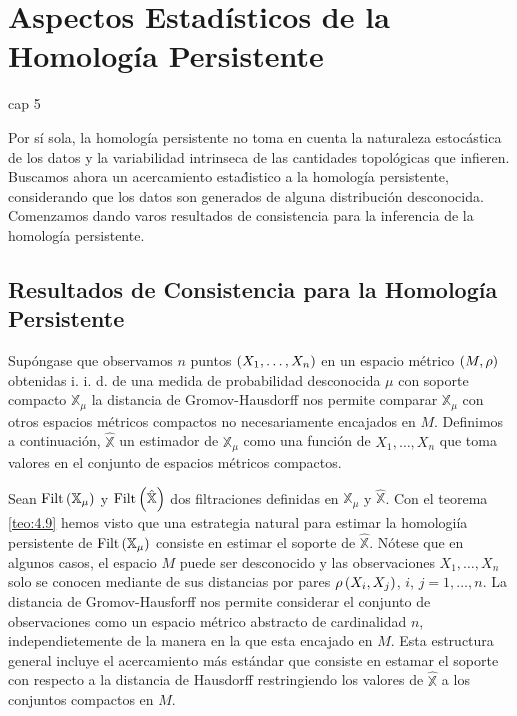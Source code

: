 \chapter{Aspectos Estad\'isticos de la Homolog\'ia Persistente}\label{chap:Cap5}cap 5

Por s\'i sola, la homolog\'ia persistente no toma en cuenta la naturaleza estoc\'astica de los datos
y la variabilidad intrinseca de las cantidades topol\'ogicas que infieren.
Buscamos ahora un acercamiento esta\'distico a la homolog\'ia persistente,
considerando que los datos son generados de alguna distribuci\'on desconocida.
Comenzamos dando varos resultados de consistencia para la inferencia de la homolog\'ia persistente.

\section{Resultados de Consistencia para la Homolog\'ia Persistente}

Sup\'ongase que observamos $n$ puntos $\left(X_{1},\dots,X_{n}\right)$ en un espacio m\'etrico
$\left(M,\rho\right)$ obtenidas i. i. d. de una medida de probabilidad desconocida $\mu$ con
soporte compacto $\mathbb{X}_{\mu}$ la distancia de Gromov-Hausdorff nos permite comparar
$\mathbb{X}_{\mu}$ con otros espacios m\'etricos compactos no necesariamente encajados en $M$.
Definimos a continuaci\'on, $\hat{\mathbb{X}}$ un estimador de $\mathbb{X}_{\mu}$
como una funci\'on de $X_{1},\dots,X_{n}$ que toma valores en el conjunto de espacios
m\'etricos compactos.

Sean $\mathrm{Filt}\left(\mathbb{X}_{\mu}\right)$ y $\mathrm{Filt}\left(\hat{\mathbb{X}}\right)$
dos filtraciones definidas en $\mathbb{X}_{\mu}$ y $\hat{\mathbb{X}}$.
Con el teorema \ref{teo:4.9} hemos visto que una estrategia natural
para estimar la homologi\'ia persistente de $\mathrm{Filt}\left(\mathbb{X}_{\mu}\right)$
consiste en estimar el soporte de $\hat{\mathbb{X}}$.
N\'otese que en algunos casos, el espacio $M$ puede ser desconocido
y las observaciones $X_{1},\dots,X_{n}$ solo se conocen mediante de sus distancias por pares
$\rho\left(X_{i}, X_{j}\right)$, $i$, $j = 1,\dots,n$.
La distancia de Gromov-Hausforff nos permite considerar el conjunto de observaciones
como un espacio m\'etrico abstracto de cardinalidad $n$,
independietemente de la manera en la que esta encajado en $M$.
Esta estructura general incluye el acercamiento m\'as est\'andar
que consiste en estamar el soporte con respecto a la distancia de Hausdorff
restringiendo los valores de $\hat{\mathbb{X}}$ a los conjuntos compactos en $M$.

